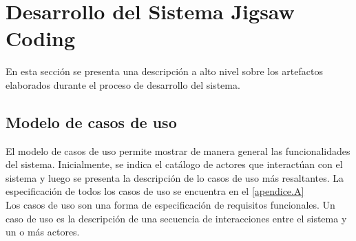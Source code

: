 \section{Desarrollo del Sistema Jigsaw Coding}
En esta sección se presenta una descripción a alto nivel sobre los artefactos elaborados durante el proceso de desarrollo del sistema.

\subsection{Modelo de casos de uso}
El modelo de casos de uso permite mostrar de manera general las funcionalidades del sistema. Inicialmente, se indica el catálogo de actores que interactúan con el sistema y luego se presenta la descripción de lo casos de uso más resaltantes. La especificación de todos los casos de uso se encuentra en el \autoref{apendice.A}\\

Los casos de uso son una forma de especificación de requisitos funcionales. Un caso de uso es la descripción de una secuencia de interacciones entre el sistema y un o más actores.\\


